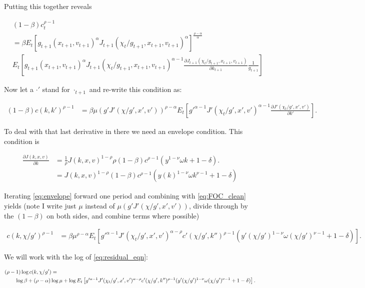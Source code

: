 \documentclass[10pt]{article}
\newcommand{\fracpd}[2]{
  \ensuremath{\frac{\partial #1}{\partial #2}}
}
\begin{document}
Putting this together reveals

\begin{align*}
  &(1 - \beta) c_{t}^{\rho - 1} \\&= \beta E_t \left[ g_{t+1}(x_{t+1}, v_{t+1})^{\alpha} J_{t+1}(\chi_t/g_{t+1}, x_{t+1}, v_{t+1})^{\alpha} \right]^{\frac{\rho - \alpha}{\alpha}} \\&E_t \left[ g_{t+1}(x_{t+1}, v_{t+1})^{\alpha} J_{t+1}(\chi_t/g_{t+1}, x_{t+1}, v_{t+1})^{\alpha - 1} \fracpd{J_{t+1}(\chi_t/g_{t+1}, x_{t+1}, v_{t+1})}{k_{t+1}} \frac{1}{g_{t+1}} \right]
\end{align*}

Now let a $\cdot'$ stand for  $\cdot_{t+1}$ and re-write this condition as:

\begin{align} \label{eq:FOC_clean}
  (1 - \beta) c(k,k')^{\rho - 1} &= \beta \mu\left(g'J'(\chi/g',x',v')\right)^{\rho- \alpha}E_t \left[ g'^{\alpha-1} J'(\chi_t/g', x', v')^{\alpha - 1} \fracpd{J'(\chi_t/g', x', v')}{k'} \right].
\end{align}

To deal with that last derivative in there we need an envelope condition. This condition is

\begin{align} \label{eq:envelope}
  \fracpd{J(k,x,v)}{k} &= \frac{1}{\rho} J(k,x,v)^{1 - \rho} \rho (1 - \beta) c^{\rho - 1} (y^{1 - \nu} \omega k + 1 - \delta). \\
  &= J(k,x,v)^{1 - \rho} (1 - \beta) c^{\rho - 1} (y(k)^{1 - \nu} \omega k^{\nu-1} + 1 - \delta)
\end{align}

Iterating \eqref{eq:envelope} forward one period and combining with \eqref{eq:FOC_clean} yields (note I write just $\mu$ instead of $\mu(g' J'(\chi/g', x', v'))$, divide through by the $(1-\beta)$ on both sides, and combine terms where possible)

\begin{align} \label{eq:residual_eqn}
  c(k,\chi/g')^{\rho - 1} &= \beta \mu^{\rho- \alpha}E_t \left[ g'^{\alpha-1} J'(\chi_t/g', x', v')^{\alpha - \rho} c'(\chi/g',k'')^{\rho - 1} (y'(\chi/g')^{1 - \nu} \omega (\chi/g')^{\nu - 1} + 1 - \delta)  \right].
\end{align}

We will work with the log of \eqref{eq:residual_eqn}:

\begin{align} \label{eq:log_residual_eqn}
  &(\rho - 1)\log c(k,\chi/g') = \notag \\
  & \qquad  \log \beta + (\rho-  \alpha) \log \mu + \log E_t \left[ g'^{\alpha-1} J'(\chi_t/g', x', v')^{\alpha - \rho} c'(\chi/g',k'')^{\rho - 1} (y'(\chi/g')^{1 - \nu} \omega (\chi/g')^{\nu - 1} + 1 - \delta)  \right].
\end{align}
\end{document}
